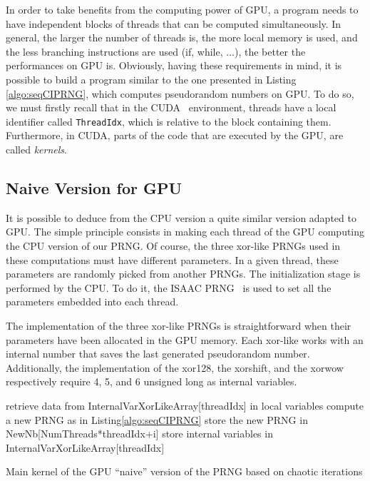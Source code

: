 \documentclass{article}
\begin{document}
In order to  take benefits from the computing power  of GPU, a program
needs  to have  independent blocks  of  threads that  can be  computed
simultaneously. In general,  the larger the number of  threads is, the
more local  memory is  used, and the  less branching  instructions are
used  (if,  while,  ...),  the  better the  performances  on  GPU  is.
Obviously, having these requirements in  mind, it is possible to build
a   program    similar   to    the   one   presented    in  Listing 
\ref{algo:seqCIPRNG}, which computes  pseudorandom numbers on GPU.  To
do  so,  we  must   firstly  recall  that  in  the  CUDA~\cite{Nvid10}
environment,    threads    have     a    local    identifier    called
\texttt{ThreadIdx},  which   is  relative  to   the  block  containing
them. Furthermore, in  CUDA, parts of  the code that are executed by the  GPU, are
called {\it kernels}.


\subsection{Naive Version for GPU}

 
It is possible to deduce from the CPU version a quite similar version adapted to GPU.
The simple principle consists in making each thread of the GPU computing the CPU version of our PRNG.  
Of course,  the  three xor-like
PRNGs  used in these computations must have different  parameters. 
In a given thread, these parameters are
randomly picked from another PRNGs. 
The  initialization stage is performed by  the CPU.
To do it, the  ISAAC  PRNG~\cite{Jenkins96} is used to  set  all  the
parameters embedded into each thread.   

The implementation of  the three
xor-like  PRNGs  is  straightforward  when  their  parameters  have  been
allocated in  the GPU memory.  Each xor-like  works with  an internal
number    that saves  the  last  generated  pseudorandom number. Additionally,  the
implementation of the  xor128, the xorshift, and the  xorwow respectively require
4, 5, and 6 unsigned long as internal variables.

\begin{algorithm}

 {
  retrieve data from InternalVarXorLikeArray[threadIdx] in local variables\;
   {
    compute a new PRNG as in Listing\ref{algo:seqCIPRNG}\;
    store the new PRNG in NewNb[NumThreads*threadIdx+i]\;
  }
  store internal variables in InternalVarXorLikeArray[threadIdx]\;
}

\caption{Main kernel of the GPU ``naive'' version of the PRNG based on chaotic iterations}
\label{algo:gpu_kernel}
\end{algorithm}
\end{document}
